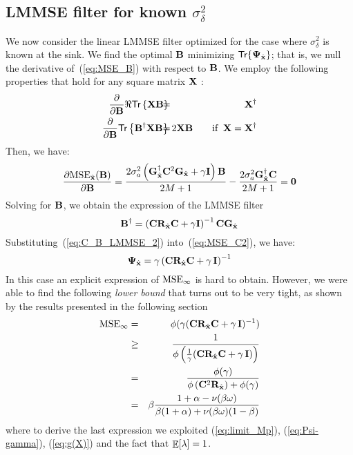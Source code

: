 \documentclass[final, a4paper]{IEEEtran}
\newcommand{\xv}{{\bf x}}
\newcommand{\zerov}{{\bf 0}}
\newcommand{\Bm}{{\bf B}}
\newcommand{\Cm}{{\bf C}}
\newcommand{\Gm}{{\bf G}}
\newcommand{\Id}{{\bf I}}
\newcommand{\Rm}{{\bf R}}
\newcommand{\Xm}{{\bf X}}
\def\xvh{{\hat{\xv}}}
\newcommand{\Psim}{\hbox{\boldmath$\Psi$}}
\def\trace{\mathsf{Tr}}
\def\non{\nonumber\\}
\def\MSEinf{{\rm MSE}_{\infty}}
\begin{document}
\subsection{LMMSE filter for known $\sigma^2_\delta$ \label{subsec:known-sigma_d}}
We now consider the linear LMMSE filter optimized for the case where $\sigma^2_\delta$ is
known at the sink. We find the optimal $\Bm$
minimizing $\trace\{\Psim_\xvh\}$; that is, we null the derivative
of~(\ref{eq:MSE_B}) with respect to $\Bm$. We employ the following properties that hold
for any square matrix $\Xm$ \cite{MatrixBook}:
\begin{eqnarray}
  \frac{\partial}{\partial \Bm} \Re\trace\left\{\Xm\Bm\right\} \hspace{-3mm}&=& \hspace{-3mm}\Xm\Herm\non
  \frac{\partial}{\partial \Bm} \trace\left\{\Bm\Herm\Xm\Bm\right\} \hspace{-3mm}&=& \hspace{-3mm}2\Xm\Bm \quad\quad
\mbox{if}\;\; \Xm = \Xm\Herm \nonumber
\end{eqnarray}
Then, we have:
\[ \frac{\partial {\rm MSE}_\xvh(\Bm)}{\partial \Bm} =
\frac{2\sigma^2_a\left(\Gm_\xvh\Herm\Cm^2\Gm_\xvh+\gamma\Id\right)\Bm}{2M+1}
-\frac{2\sigma^2_a\Gm_\xvh\Herm\Cm}{2M+1}=\zerov \]
Solving for $\Bm$, we obtain the expression of the LMMSE filter
\begin{equation}
\Bm\Herm =  \left(\Cm\Rm_\xvh\Cm+\gamma\Id\right)^{-1}\Cm\Gm_\xvh
\label{eq:C_B_LMMSE_2}
\end{equation}
Substituting~(\ref{eq:C_B_LMMSE_2}) into~(\ref{eq:MSE_C2}), we have:
\begin{equation}
\Psim_\xvh = \gamma \left(\Cm\Rm_\xvh\Cm +\gamma\,\Id\right)^{-1}
\label{eq:MSE_C_LMMSE2}
\end{equation}
In this case an explicit expression of $\MSEinf$ is hard to obtain.
However, we were able to find the following {\em lower bound} that
turns out to be very tight, as shown by the results presented in
the following section
\begin{eqnarray}
\label{eq:MSEinf_C_LMMSE-D}
\MSEinf &=& \phi(\gamma (\Cm\Rm_\xvh\Cm +\gamma\,\Id)^{-1})\nonumber\\
& \geq &\frac{1}{\phi\left(\frac{1}{\gamma}(\Cm\Rm_\xvh\Cm +\gamma\,\Id)\right)}\non
& = &\frac{\phi(\gamma)}{\phi\left(\Cm^2\Rm_\xvh\right) +\phi(\gamma)}\non
& = & \beta\frac{1+\alpha-\nu(\beta \omega)}{\beta(1+\alpha)+\nu(\beta \omega)(1-\beta)}
\end{eqnarray}
where to derive the last expression we exploited (\ref{eq:limit_Mp}), (\ref{eq:Psi-gamma}),
(\ref{eq:g(X)}) and the fact that $\mathop{\mathbb{E}}\limits[\lambda]=1$.
\end{document}
